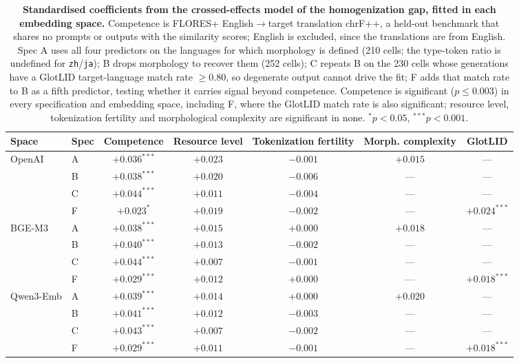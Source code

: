 \begin{table}[t]
\centering
\caption{\textbf{Standardised coefficients from the crossed-effects model of the homogenization gap, fitted in each embedding space.} Competence is FLORES+ English$\to$target translation chrF++, a held-out benchmark that shares no prompts or outputs with the similarity scores; English is excluded, since the translations are from English. Spec A uses all four predictors on the languages for which morphology is defined (210 cells; the type-token ratio is undefined for \texttt{zh}/\texttt{ja}); B drops morphology to recover them (252 cells); C repeats B on the 230 cells whose generations have a GlotLID target-language match rate $\geq 0.80$, so degenerate output cannot drive the fit; F adds that match rate to B as a fifth predictor, testing whether it carries signal beyond competence. Competence is significant ($p \leq 0.003$) in every specification and embedding space, including F, where the GlotLID match rate is also significant; resource level, tokenization fertility and morphological complexity are significant in none. $^{*}p<0.05$, $^{***}p<0.001$.}
\small
\setlength{\tabcolsep}{3.5pt}
\begin{tabular}{llccccc}
\toprule
\textbf{Space} & \textbf{Spec} & \textbf{Competence} & \textbf{Resource level} & \textbf{Tokenization fertility} & \textbf{Morph. complexity} & \textbf{GlotLID} \\
\midrule
OpenAI & A & $+0.036^{***}$ & $+0.023$ & $-0.001$ & $+0.015$ & --- \\
 & B & $+0.038^{***}$ & $+0.020$ & $-0.006$ & --- & --- \\
 & C & $+0.044^{***}$ & $+0.011$ & $-0.004$ & --- & --- \\
 & F & $+0.023^{*}$ & $+0.019$ & $-0.002$ & --- & $+0.024^{***}$ \\
\midrule
BGE-M3 & A & $+0.038^{***}$ & $+0.015$ & $+0.000$ & $+0.018$ & --- \\
 & B & $+0.040^{***}$ & $+0.013$ & $-0.002$ & --- & --- \\
 & C & $+0.044^{***}$ & $+0.007$ & $-0.001$ & --- & --- \\
 & F & $+0.029^{***}$ & $+0.012$ & $+0.000$ & --- & $+0.018^{***}$ \\
\midrule
Qwen3-Emb & A & $+0.039^{***}$ & $+0.014$ & $+0.000$ & $+0.020$ & --- \\
 & B & $+0.041^{***}$ & $+0.012$ & $-0.003$ & --- & --- \\
 & C & $+0.043^{***}$ & $+0.007$ & $-0.002$ & --- & --- \\
 & F & $+0.029^{***}$ & $+0.011$ & $-0.001$ & --- & $+0.018^{***}$ \\
\bottomrule
\end{tabular}
\label{tab:regression}
\end{table}
